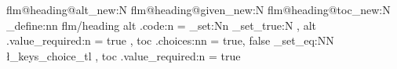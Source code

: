 %
%
\ExplSyntaxOn
\ifcsname flm@heading@alt\endcsname\else\tl_new:N \flm@heading@alt\fi
\ifcsname flm@heading@given\endcsname\else\bool_new:N \flm@heading@given\fi
\ifcsname flm@heading@toc\endcsname\else\tl_new:N \flm@heading@toc\fi
\keys_define:nn {flm/heading}
  {alt .code:n = {\tl_set:Nn 
                  \bool_set_true:N \flm@heading@given} ,
   alt .value_required:n = true ,
   toc .choices:nn = {true, false} {\tl_set_eq:NN \flm@heading@toc \l_keys_choice_tl} ,
   toc .value_required:n = true}
\def\flm@heading@withalt#1#2#3{#2[#1]{#3}}
\def\flm@heading@addtoc#1#2{\addcontentsline{toc}{#1}{#2}}
\def\flm@heading@notoc#1{\PackageWarning{flm}{toc=false~on~the~unstarred~
  \string#1~is~not~honored~by~the~default~\string\flmHeading;~the~heading~
  stays~in~the~table~of~contents}}
